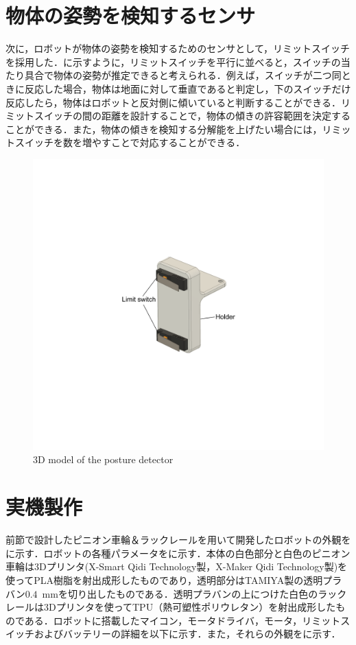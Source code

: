 \section{物体の姿勢を検知するセンサ}
次に，ロボットが物体の姿勢を検知するためのセンサとして，リミットスイッチを採用した．に示すように，リミットスイッチを平行に並べると，スイッチの当たり具合で物体の姿勢が推定できると考えられる．例えば，スイッチが二つ同ときに反応した場合，物体は地面に対して垂直であると判定し，下のスイッチだけ反応したら，物体はロボットと反対側に傾いていると判断することができる．リミットスイッチの間の距離を設計することで，物体の傾きの許容範囲を決定することができる．また，物体の傾きを検知する分解能を上げたい場合には，リミットスイッチを数を増やすことで対応することができる．

\begin{figure}[tb]
  \centering
  \includegraphics[width=.5\columnwidth]{figure/posture-detector.pdf}
  \caption{3D model of the posture detector}
  \label{fig:limit-switch-edited}
\end{figure}

\section{実機製作}
前節で設計したピニオン車輪＆ラックレールを用いて開発したロボットの外観をに示す．ロボットの各種パラメータをに示す．本体の白色部分と白色のピニオン車輪は3Dプリンタ(X-Smart Qidi Technology製，X-Maker Qidi Technology製)を使ってPLA樹脂を射出成形したものであり，透明部分はTAMIYA製の透明プラバン$0.4$~mmを切り出したものである．透明プラバンの上につけた白色のラックレールは3Dプリンタを使ってTPU（熱可塑性ポリウレタン）を射出成形したものである．ロボットに搭載したマイコン，モータドライバ，モータ，リミットスイッチおよびバッテリーの詳細を以下に示す．また，それらの外観をに示す．

